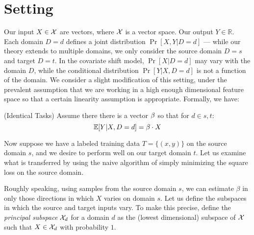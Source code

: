 
\section{Setting}

Our input $X\in\mathcal{X}$ are vectors, where $\mathcal{X}$ is a vector
space. Our output $Y\in\mathbb{R}$.  Each domain $D=d$ defines a joint
distribution $\Pr[X,Y|D=d]$ --- while our theory extends to multiple
domains, we only consider the source domain $D=s$ and target $D=t$.
In the covariate shift model, $\Pr[X|D=d]$ may vary with the domain
$D$, while the conditional distribution $\Pr[Y|X,D=d]$ is not a
function of the domain.  We consider a slight modification of this
setting, under the prevalent assumption that we are working in a high
enough dimensional feature space so that a certain linearity
assumption is appropriate.  Formally, we have:

\begin{assumption} \label{ass:same_task}
(Identical Tasks) Assume there there is a vector $\beta$ so that
for $d\in {s,t}$:
\[
{\mathbb E} [Y|X,D=d] = \beta \cdot X
\]
\end{assumption}


Now suppose we have a labeled training data $T=\{(x,y)\}$ on the
source domain $s$, and we desire to perform well on our target
domain $t$. Let us examine what is transferred by using the naive
algorithm of simply minimizing the square loss on the source domain.

Roughly speaking, using samples from the source domain
$s$, we can estimate $\beta$ in only those directions in which $X$ varies
on domain $s$. Let us define the subspaces in which the source 
and target inputs vary. To make this precise, define the \emph{principal
  subspace} $\mathcal{X}_d$ for a domain $d$ as the (lowest dimensional)
subspace of $\mathcal{X}$ such that $X\in \mathcal{X}_d$ with probability $1$.

